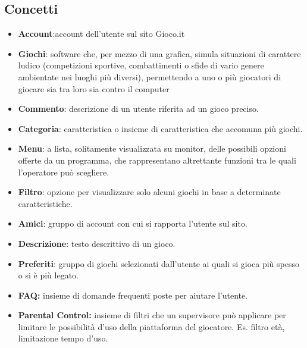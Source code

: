 \documentclass[../Report.tex]{subfiles}
\begin{document}
    \subsection{Concetti}
 \begin{itemize}
    \item    \textbf{Account}:account dell'utente sul sito Gioco.it
    \item    \textbf{Giochi}: software che, per mezzo di una grafica, simula situazioni di carattere ludico (competizioni sportive, combattimenti o sfide di vario genere ambientate nei luoghi più diversi), permettendo a uno o più giocatori di giocare sia tra loro sia contro il computer
    \item    \textbf{Commento}: descrizione di un utente riferita ad un gioco preciso. 
    \item    \textbf{Categoria}: caratteristica o insieme di caratteristica che accomuna più giochi.
    \item    \textbf{Menu}: a lista, solitamente visualizzata su monitor, delle possibili opzioni offerte da un programma, che rappresentano altrettante funzioni tra le quali l’operatore può scegliere.
    \item    \textbf{Filtro}: opzione per visualizzare solo alcuni giochi in base a determinate caratteristiche.
    \item    \textbf{Amici}: gruppo di account con cui si rapporta l'utente sul sito.
    \item    \textbf{Descrizione}: testo descrittivo di un gioco.
    \item    \textbf{Preferiti}: gruppo di giochi selezionati dall'utente ai quali si gioca più spesso o si è più legato.
    \item \textbf{FAQ:} insieme di domande frequenti poste per aiutare l'utente.
    \item \textbf{Parental Control:} insieme di filtri che un supervisore può applicare per limitare le possibilità d'uso della piattaforma del giocatore. Es. filtro età, limitazione tempo d'uso. 
 \end{itemize}
\end{document}
